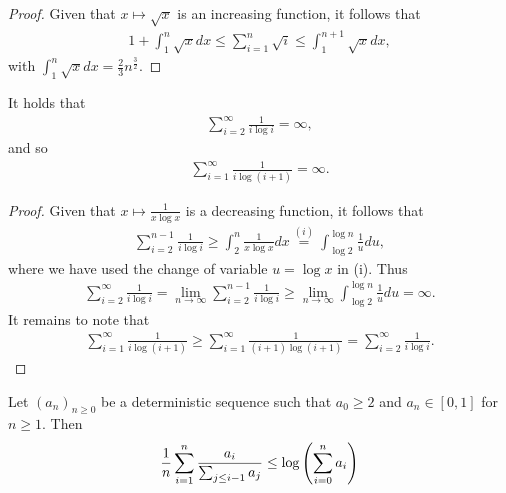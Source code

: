 \begin{proof}
    Given that $x \mapsto \sqrt x$ is an increasing function, it follows that
    \begin{align*}
        1 + \int_1^n \sqrt{x}dx \leq \sum_{i = 1}^n \sqrt{i} \leq  \int_1^{n+1} \sqrt{x}dx,
    \end{align*}
    with $\int_1^n \sqrt{x}dx = \frac{2}{3} 
 n^{\frac{3}{2}}$. 
\end{proof}

\begin{lemma} \label{lemma:series_one_over_ilogi}
It holds that
\begin{align*}
    \sum_{i = 2}^\infty \frac{1}{i \log i } = \infty,
\end{align*}
and so 
\begin{align*}
    \sum_{i = 1}^\infty \frac{1}{i \log (i+1) } = \infty.
\end{align*}
\end{lemma}

\begin{proof}
    Given that $x \mapsto \frac{1}{x \log x}$ is a decreasing function, it follows that
    \begin{align*}
         \sum_{i = 2}^{n-1} \frac{1}{i \log i } \geq \int_2^n \frac{1}{x \log x} dx \stackrel{(i)}{=} \int_{\log 2}^{\log n} \frac{1}{u} du,
    \end{align*}
    where we have used the change of variable $u = \log x$ in (i). Thus
    \begin{align*}
        \sum_{i = 2}^{\infty} \frac{1}{i \log i } = \lim_{n\to\infty}\sum_{i = 2}^{n-1} \frac{1}{i \log i } \geq \lim_{n\to\infty} \int_{\log 2}^{\log n} \frac{1}{u} du = \infty.
    \end{align*}
    It remains to note that 
    \begin{align*}
        \sum_{i = 1}^\infty \frac{1}{i \log (i+1) } \geq  \sum_{i = 1}^\infty \frac{1}{(i+1) \log (i+1) } =  \sum_{i = 2}^{\infty} \frac{1}{i \log i }.
    \end{align*}
\end{proof}


\begin{lemma} \label{lemma:sum_ai_over_sum_ai}
    Let $(a_{n})_{n \geq 0}$ be a deterministic sequence such that $a_0 \geq 2$ and $a_n \in [0,1]$ for $n \geq 1$. Then
    \begin{align*}
        \frac{1}{n}\sum_{i = 1}^n \frac{a_i}{\sum_{j \leq i-1} a_{j}} \leq \log \left( \sum_{i = 0}^n a_i\right)
    \end{align*}
\end{lemma}


